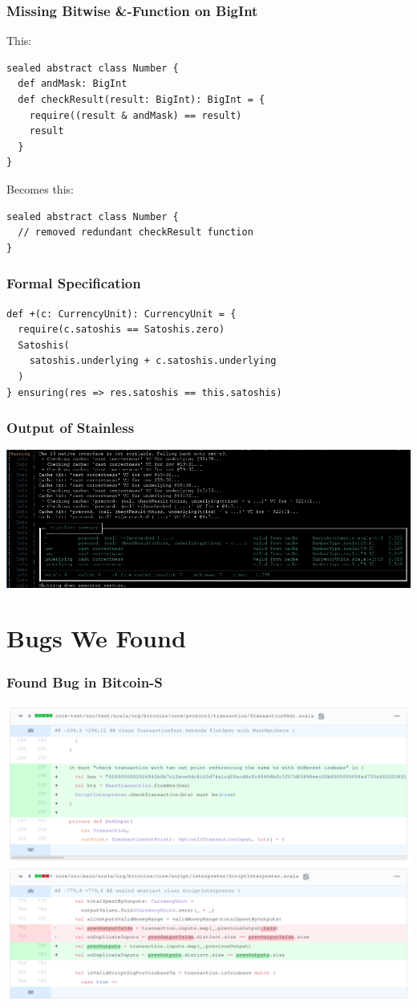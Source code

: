 \documentclass{beamer}
\begin{document}
\begin{frame}[fragile]
\frametitle{Missing Bitwise \&-Function on BigInt}
This:
\begin{lstlisting}[style=scala]
sealed abstract class Number {
  def andMask: BigInt
  def checkResult(result: BigInt): BigInt = {
    require((result & andMask) == result)
    result
  }
}  
\end{lstlisting}
Becomes this:
\begin{lstlisting}[style=scala]
sealed abstract class Number {
  // removed redundant checkResult function
}
\end{lstlisting}
\end{frame}


\begin{frame}[fragile]
\frametitle{Formal Specification}
\begin{lstlisting}[style=scala]
def +(c: CurrencyUnit): CurrencyUnit = {
  require(c.satoshis == Satoshis.zero)
  Satoshis(
    satoshis.underlying + c.satoshis.underlying
  )
} ensuring(res => res.satoshis == this.satoshis)
\end{lstlisting}
\end{frame}


\begin{frame}
\frametitle{Output of Stainless}
\centering
\includegraphics[width=\textwidth,height=0.8\textheight,keepaspectratio]{assets/final_verify_output.png}
\end{frame}



\section{Bugs We Found}


\begin{frame}
\frametitle{Found Bug in Bitcoin-S}
\includegraphics[width=\textwidth,height=0.8\textheight,keepaspectratio]{assets/bitcoin-s-pr.png}
\end{frame}
\end{document}
